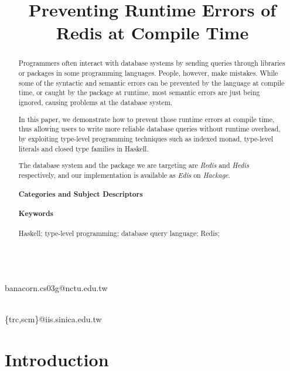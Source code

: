 \documentclass[pldi]{sigplanconf-pldi16}
\begin{document}
\title{Preventing Runtime Errors of Redis at Compile Time}

%
%

{ \\
}
{banacorn.cs03g@nctu.edu.tw}

{ \\
}
{\{trc,scm\}@iis.sinica.edu.tw}

\maketitle

\begin{abstract}
Programmers often interact with database systems by sending queries through libraries or packages in some programming languages. People, however, make mistakes.
While some of the syntactic and semantic errors can be prevented by the
 language at compile time, or caught by the package at runtime, most semantic
 errors are just being ignored, causing problems at the database system.

In this paper, we demonstrate how to prevent those runtime errors at compile
 time, thus allowing users to write more reliable database queries without
 runtime overhead, by exploiting type-level programming techniques such as
 indexed monad, type-level literals and closed type families in Haskell.

The database system and the package we are targeting are \emph{Redis} and
 \emph{Hedis} respectively, and our implementation is available as \emph{Edis}
 on \emph{Hackage}.

\paragraph{Categories and Subject Descriptors}
\paragraph{Keywords}
Haskell; type-level programming; database query language; Redis;
\end{abstract}

\section{Introduction}
\end{document}
